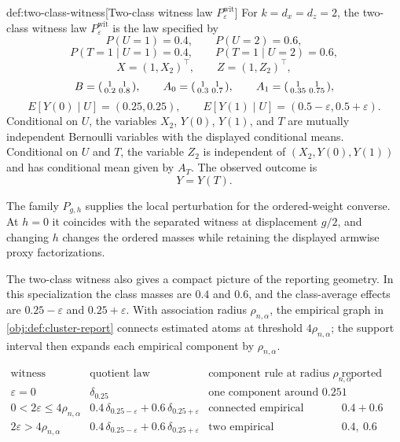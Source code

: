 \begin{definitionv}{def:two-class-witness}[Two-class witness law \(P_{\varepsilon}^{\mathrm{wit}}\)]
For \(k=d_x=d_z=2\), the two-class witness law \(P_{\varepsilon}^{\mathrm{wit}}\) is the law specified by
\[
P(U=1)=0.4,\qquad P(U=2)=0.6,
\]
\[
P(T=1\mid U=1)=0.4,\qquad P(T=1\mid U=2)=0.6,
\]
\[
X=(1,X_2)^\top,\qquad Z=(1,Z_2)^\top,
\]
\[
B=\begin{psmallmatrix}1&1\\0.2&0.8\end{psmallmatrix},
\qquad
A_0=\begin{psmallmatrix}1&1\\0.3&0.7\end{psmallmatrix},
\qquad
A_1=\begin{psmallmatrix}1&1\\0.35&0.75\end{psmallmatrix},
\]
\[
E[Y(0)\mid U]=(0.25,0.25),
\qquad
E[Y(1)\mid U]=(0.5-\varepsilon,0.5+\varepsilon).
\]
Conditional on \(U\), the variables \(X_2\), \(Y(0)\), \(Y(1)\), and \(T\) are mutually independent Bernoulli variables with the displayed conditional means. Conditional on \(U\) and \(T\), the variable \(Z_2\) is independent of \((X_2,Y(0),Y(1))\) and has conditional mean given by \(A_T\). The observed outcome is
\[
Y=Y(T).
\]
\end{definitionv}

The family \(P_{g,h}\) supplies the local perturbation for the ordered-weight converse. At \(h=0\) it coincides with the separated witness at displacement \(g/2\), and changing \(h\) changes the ordered masses while retaining the displayed armwise proxy factorizations.

The two-class witness also gives a compact picture of the reporting geometry. In this specialization the class masses are \(0.4\) and \(0.6\), and the class-average effects are \(0.25-\varepsilon\) and \(0.25+\varepsilon\). With association radius \(\rho_{n,\alpha}\), the empirical graph in \cref{obj:def:cluster-report} connects estimated atoms at threshold \(4\rho_{n,\alpha}\); the support interval then expands each empirical component by \(\rho_{n,\alpha}\).

\[
\begin{array}{c|c|c|c}
\text{witness regime} & \text{quotient law} & \text{component rule at radius }\rho_{n,\alpha} & \text{reported mass target}\\
\hline
\varepsilon=0
& \delta_{0.25}
& \text{one component around }0.25
& 1\\
0<2\varepsilon\le 4\rho_{n,\alpha}
& 0.4\,\delta_{0.25-\varepsilon}+0.6\,\delta_{0.25+\varepsilon}
& \text{connected empirical component}
& 0.4+0.6\\
2\varepsilon>4\rho_{n,\alpha}
& 0.4\,\delta_{0.25-\varepsilon}+0.6\,\delta_{0.25+\varepsilon}
& \text{two empirical components when the center is separated}
& 0.4,\ 0.6
\end{array}
\]

